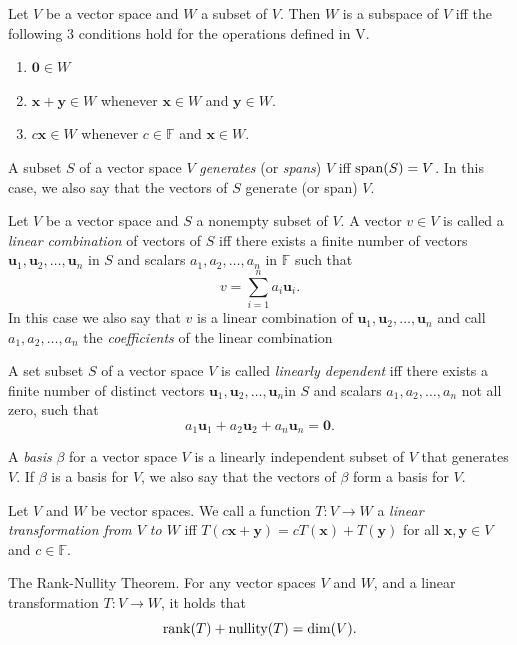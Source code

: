 \begin{theorem}{}{}
    Let \(V\) be a vector space and \(W\) a subset of \(V\). Then \(W\) is a subspace of \(V\) iff the following 3 conditions hold for the operations defined in V.
            \begin{enumerate}[label=(\alph*)]
                \item \(\mathbf{0} \in W\) \label{Theorem 1.3(a)}
                \item \(\mathbf{x}+\mathbf{y} \in W\) whenever \(\mathbf{x} \in W\) and \(\mathbf{y} \in W\). \label{Theorem 1.3(b)}
                \item \(c\mathbf{x} \in W\) whenever \(c \in \mathbb{F}\) and \(\mathbf{x} \in W\). \label{Theorem 1.3(c)}
            \end{enumerate}
\end{theorem}
\begin{definition}{}{}
    A subset \(S\) of a vector space \(V\) \emph{generates} (or \emph{spans}) \(V\) iff \(\operatorname{span}(S)=V\). In this case, we also say that the vectors of \(S\) generate (or span) \(V\).
\end{definition}
\begin{definition}{}{}
    Let \(V\) be a vector space and \(S\) a nonempty subset of \(V\). A vector \(v \in V\) is called a \emph{linear combination} of vectors of \(S\) iff there exists a finite number of vectors \(\mathbf{u}_1,\mathbf{u}_2,\dots,\mathbf{u}_n\) in \(S\) and scalars \(a_1,a_2,\dots,a_n\) in \(\mathbb{F}\) such that
            \[v=\sum_{i=1}^{n}{a_i\mathbf{u}_i}.\]
            In this case we also say that \(v\) is a linear combination of \(\mathbf{u}_1,\mathbf{u}_2,\dots,\mathbf{u}_n\) and call \(a_1,a_2,\dots,a_n\) the \emph{coefficients} of the linear combination
\end{definition}
\begin{definition}{}{}
    A set subset \(S\) of a vector space \(V\) is called \emph{linearly dependent} iff there exists a finite number of distinct vectors \(\mathbf{u}_1,\mathbf{u}_2,\dots,\mathbf{u}_n\)in \(S\) and scalars \(a_1,a_2,\dots,a_n\) not all zero, such that
            \[a_1\mathbf{u}_1+a_2\mathbf{u}_2+a_n\mathbf{u}_n=\mathbf{0}.\]
\end{definition}
\begin{definition}{}{}
    A \emph{basis} \(\beta\) for a vector space \(V\) is a linearly independent subset of \(V\) that generates \(V\). If \(\beta\) is a basis for \(V\), we also say that the vectors of \(\beta\) form a basis for \(V\).
\end{definition}
\begin{definition}{}{}
    Let \(V\) and \(W\) be vector spaces. We call a function \(T\colon V\to W\) a \emph{linear transformation from \(V\) to \(W\)} iff \(T(c\mathbf{x}+\mathbf{y})=cT(\mathbf{x})+T(\mathbf{y})\) for all \(\mathbf{x},\mathbf{y}\in V\) and \(c\in \mathbb{F}\).
\end{definition}
\begin{theorem}{The Rank-Nullity Theorem.}{}
    For any vector spaces \(V\) and \(W\), and a linear transformation \(T \colon V \to W\), it holds that
    \[\operatorname{rank}(T)+\operatorname{nullity}(T)=\dim(V).\]
\end{theorem}
